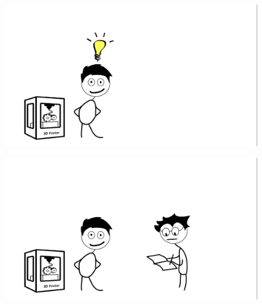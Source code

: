 \begin{frame}
\begin{figure}

\vspace{-.7cm}	
\hspace{-2cm}		\includegraphics[width=1.2\linewidth]{Pictures/animations/animation_3.png}
		\end{figure}

\end{frame}

\begin{frame}
\begin{figure}

\vspace{-.7cm}	
\hspace{-2cm}		\includegraphics[width=1.2\linewidth]{Pictures/animations/animation_4.png}
		\end{figure}

\end{frame}

